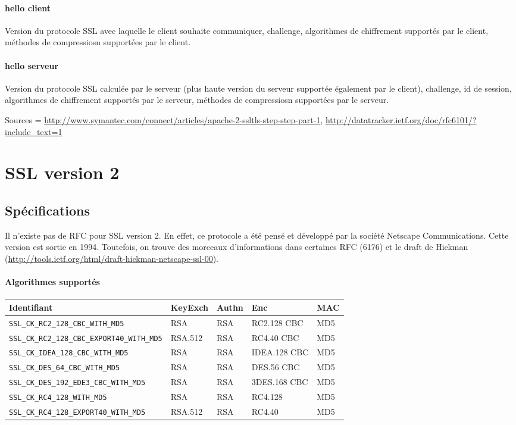 \documentclass[a4paper,11pt,french]{article}
\begin{document}
\paragraph{hello client}
Version du protocole SSL avec laquelle le client souhaite communiquer, challenge, algorithmes de chiffrement supportés par le client, méthodes de compressiosn supportées par le client.

\paragraph{hello serveur}
Version du protocole SSL calculée par le serveur (plus haute version du serveur supportée également par le client), challenge, id de session, algorithmes de chiffrement supportés par le serveur, méthodes de compressiosn supportées par le serveur.



Sources = \url{http://www.symantec.com/connect/articles/apache-2-ssltls-step-step-part-1}, \url{http://datatracker.ietf.org/doc/rfc6101/?include_text=1}

\pagebreak
\section{SSL version 2}
\subsection{Spécifications}
Il n'existe pas de RFC pour SSL version 2. En effet, ce protocole a été pensé et développé par la société Netscape Communications. Cette version est sortie en 1994. Toutefois, on trouve des morceaux d'informations dans certaines RFC (6176) et le draft de Hickman (\url{http://tools.ietf.org/html/draft-hickman-netscape-ssl-00}).

\paragraph{Algorithmes supportés} 
\begin{center}
\begin{tabularx}{17cm}{|l|l|l|X|l|}
\hline
\textbf{Identifiant} & \textbf{KeyExch} & \textbf{Authn}& \textbf{Enc}& \textbf{MAC}\\
\hline
\verb+SSL_CK_RC2_128_CBC_WITH_MD5+&RSA&RSA&RC2.128 CBC&MD5\\
\hline
\verb+SSL_CK_RC2_128_CBC_EXPORT40_WITH_MD5+&RSA.512&RSA&RC4.40 CBC&MD5\\
\hline
\verb+SSL_CK_IDEA_128_CBC_WITH_MD5+&RSA&RSA&IDEA.128 CBC&MD5\\
\hline
\verb+SSL_CK_DES_64_CBC_WITH_MD5+&RSA&RSA&DES.56 CBC&MD5\\
\hline
\verb+SSL_CK_DES_192_EDE3_CBC_WITH_MD5+&RSA&RSA&3DES.168 CBC&MD5\\
\hline
\verb+SSL_CK_RC4_128_WITH_MD5+&RSA&RSA&RC4.128&MD5\\
\hline
\verb+SSL_CK_RC4_128_EXPORT40_WITH_MD5+&RSA.512&RSA&RC4.40&MD5\\
\hline
\end{tabularx}
\end{center}
\end{document}

